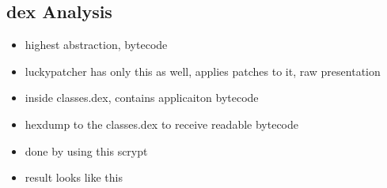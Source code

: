 \subsection{dex Analysis} \label{subsection:tools-dex}
\begin{itemize}
    \item highest abstraction, bytecode
    \item luckypatcher has only this as well, applies patches to it, raw presentation
    \item inside classes.dex, contains applicaiton bytecode
    \item hexdump to the classes.dex to receive readable bytecode
    \item done by using this scrypt
    \item result looks like this
\end{itemize}
